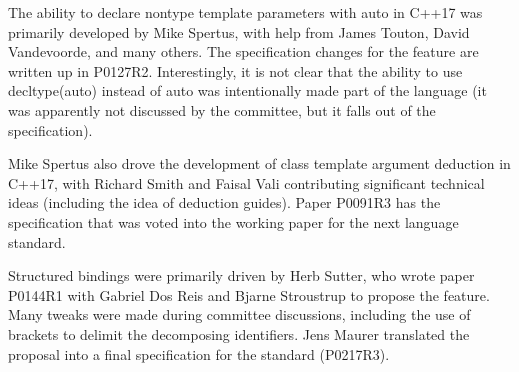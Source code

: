 The ability to declare nontype template parameters with auto in C++17 was primarily developed by Mike Spertus, with help from James Touton, David Vandevoorde, and many others. The specification changes for the feature are written up in P0127R2. Interestingly, it is not clear that the ability to use decltype(auto) instead of auto was intentionally made part of the language (it was apparently not discussed by the committee, but it falls out of the specification).

Mike Spertus also drove the development of class template argument deduction in C++17, with Richard Smith and Faisal Vali contributing significant technical ideas (including the idea of deduction guides). Paper P0091R3 has the specification that was voted into the working paper for the next language standard.

Structured bindings were primarily driven by Herb Sutter, who wrote paper P0144R1 with Gabriel Dos Reis and Bjarne Stroustrup to propose the feature. Many tweaks were made during committee discussions, including the use of brackets to delimit the decomposing identifiers. Jens Maurer translated the proposal into a final specification for the standard (P0217R3).





